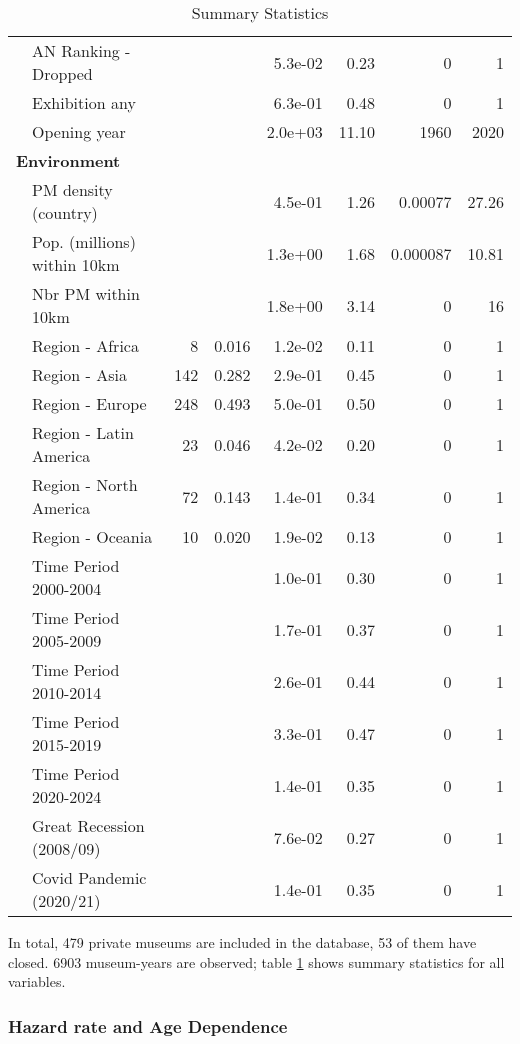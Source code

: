 \documentclass[12pt]{article}
\begin{document}
\begin{table}[ht]
\begin{tabular}{llrrrrrr}
   & AN Ranking - Dropped &  &  & 5.3e-02 &  0.23 & 0 & 1 \\ 
   & Exhibition any &  &  & 6.3e-01 &  0.48 & 0 & 1 \\ 
   & Opening year &  &  & 2.0e+03 & 11.10 & 1960 & 2020 \\ 
   \multicolumn{8}{l}{\textbf{Environment}} \\ 
 & PM density (country) &  &  & 4.5e-01 &  1.26 & 0.00077 & 27.26 \\ 
   & Pop. (millions) within 10km &  &  & 1.3e+00 &  1.68 & 0.000087 & 10.81 \\ 
   & Nbr PM within 10km &  &  & 1.8e+00 &  3.14 & 0 & 16 \\ 
   & Region - Africa & 8 & 0.016 & 1.2e-02 &  0.11 & 0 & 1 \\ 
   & Region - Asia & 142 & 0.282 & 2.9e-01 &  0.45 & 0 & 1 \\ 
   & Region - Europe & 248 & 0.493 & 5.0e-01 &  0.50 & 0 & 1 \\ 
   & Region - Latin America & 23 & 0.046 & 4.2e-02 &  0.20 & 0 & 1 \\ 
   & Region - North America & 72 & 0.143 & 1.4e-01 &  0.34 & 0 & 1 \\ 
   & Region - Oceania & 10 & 0.020 & 1.9e-02 &  0.13 & 0 & 1 \\ 
   & Time Period 2000-2004 &  &  & 1.0e-01 &  0.30 & 0 & 1 \\ 
   & Time Period 2005-2009 &  &  & 1.7e-01 &  0.37 & 0 & 1 \\ 
   & Time Period 2010-2014 &  &  & 2.6e-01 &  0.44 & 0 & 1 \\ 
   & Time Period 2015-2019 &  &  & 3.3e-01 &  0.47 & 0 & 1 \\ 
   & Time Period 2020-2024 &  &  & 1.4e-01 &  0.35 & 0 & 1 \\ 
   & Great Recession (2008/09) &  &  & 7.6e-02 &  0.27 & 0 & 1 \\ 
   & Covid Pandemic (2020/21) &  &  & 1.4e-01 &  0.35 & 0 & 1 \\ 
   \hline
\end{tabular}
\caption{Summary Statistics} 
\label{tbl:t_sumstats}
\end{table}

In total, 479 private museums are included in the database, 53 of them have closed.
6903 museum-years are observed; table \ref{tbl:t_sumstats} shows summary statistics for all variables.

\subsubsection*{Hazard rate and Age Dependence}
\end{document}
